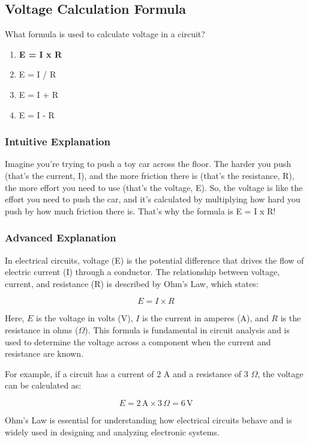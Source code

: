 \subsection{Voltage Calculation Formula}
\label{T5D02}

\begin{tcolorbox}[colback=gray!10!white,colframe=black!75!black,title=T5D02]
What formula is used to calculate voltage in a circuit?
\begin{enumerate}[label=\Alph*)]
    \item \textbf{E = I x R}
    \item E = I / R
    \item E = I + R
    \item E = I - R
\end{enumerate}
\end{tcolorbox}

\subsubsection{Intuitive Explanation}
Imagine you're trying to push a toy car across the floor. The harder you push (that's the current, I), and the more friction there is (that's the resistance, R), the more effort you need to use (that's the voltage, E). So, the voltage is like the effort you need to push the car, and it’s calculated by multiplying how hard you push by how much friction there is. That’s why the formula is E = I x R!

\subsubsection{Advanced Explanation}
In electrical circuits, voltage (E) is the potential difference that drives the flow of electric current (I) through a conductor. The relationship between voltage, current, and resistance (R) is described by Ohm's Law, which states:

\[
E = I \times R
\]

Here, \(E\) is the voltage in volts (V), \(I\) is the current in amperes (A), and \(R\) is the resistance in ohms (\(\Omega\)). This formula is fundamental in circuit analysis and is used to determine the voltage across a component when the current and resistance are known.

For example, if a circuit has a current of 2 A and a resistance of 3 \(\Omega\), the voltage can be calculated as:

\[
E = 2 \, \text{A} \times 3 \, \Omega = 6 \, \text{V}
\]

Ohm's Law is essential for understanding how electrical circuits behave and is widely used in designing and analyzing electronic systems.

